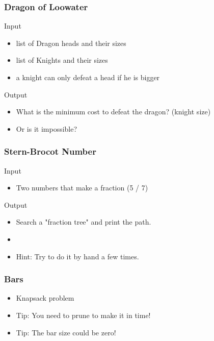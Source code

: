 \begin{frame}
  \frametitle{Dragon of Loowater}

  \begin{block}{Input}
    \begin{itemize}
      \item list of Dragon heads and their sizes
      \item list of Knights and their sizes
      \item a knight can only defeat a head if he is bigger
    \end{itemize}
  \end{block}

  \begin{exampleblock}{Output}
    \begin{itemize}
      \item What is the minimum cost to defeat the dragon? (knight size)
      \item Or is it impossible?
    \end{itemize}
  \end{exampleblock}
\end{frame}

\begin{frame}
  \frametitle{Stern-Brocot Number}

  \begin{block}{Input}
    \begin{itemize}
    \item Two numbers that make a fraction (5 / 7)
    \end{itemize}
  \end{block}

  \begin{exampleblock}{Output}
    \begin{itemize}
      \item Search a "fraction tree" and print the path.
      \item {}
      \bigskip

      \item Hint: Try to do it by hand a few times.
    \end{itemize}
  \end{exampleblock}
\end{frame}

\begin{frame}
  \frametitle{Bars}

  \begin{block}{}
    \begin{itemize}
    \item Knapsack problem
    \end{itemize}
  \end{block}

  \begin{itemize}
    \item \alert{Tip:} You need to prune to make it in time!
    \item \alert{Tip:} The bar size could be zero!
  \end{itemize}
  \end{frame}

